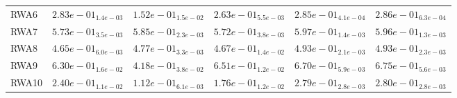 \documentclass{article}
\begin{document}
\begin{table}
\begin{scriptsize}
\begin{tabular}{llllll}
RWA6 & $  2.83e-01_{ 1.4e-03}$ & $  1.52e-01_{ 1.5e-02}$ & $  2.63e-01_{ 5.5e-03}$ & \cellcolor{gray25}$  2.85e-01_{ 4.1e-04}$ & \cellcolor{gray95}$  2.86e-01_{ 6.3e-04}$ \\
RWA7 & $  5.73e-01_{ 3.5e-03}$ & $  5.85e-01_{ 2.3e-03}$ & $  5.72e-01_{ 3.8e-03}$ & \cellcolor{gray95}$  5.97e-01_{ 1.4e-03}$ & \cellcolor{gray25}$  5.96e-01_{ 1.3e-03}$ \\
RWA8 & $  4.65e-01_{ 6.0e-03}$ & $  4.77e-01_{ 3.3e-03}$ & $  4.67e-01_{ 1.4e-02}$ & \cellcolor{gray25}$  4.93e-01_{ 2.1e-03}$ & \cellcolor{gray95}$  4.93e-01_{ 2.3e-03}$ \\
RWA9 & $  6.30e-01_{ 1.6e-02}$ & $  4.18e-01_{ 3.8e-02}$ & $  6.51e-01_{ 1.2e-02}$ & \cellcolor{gray25}$  6.70e-01_{ 5.9e-03}$ & \cellcolor{gray95}$  6.75e-01_{ 5.6e-03}$ \\
RWA10 & $  2.40e-01_{ 1.1e-02}$ & $  1.12e-01_{ 6.1e-03}$ & $  1.76e-01_{ 1.2e-02}$ & \cellcolor{gray25}$  2.79e-01_{ 2.8e-03}$ & \cellcolor{gray95}$  2.80e-01_{ 2.8e-03}$ \\
\hline
\end{tabular}
\end{scriptsize}
\end{table}
\end{document}
